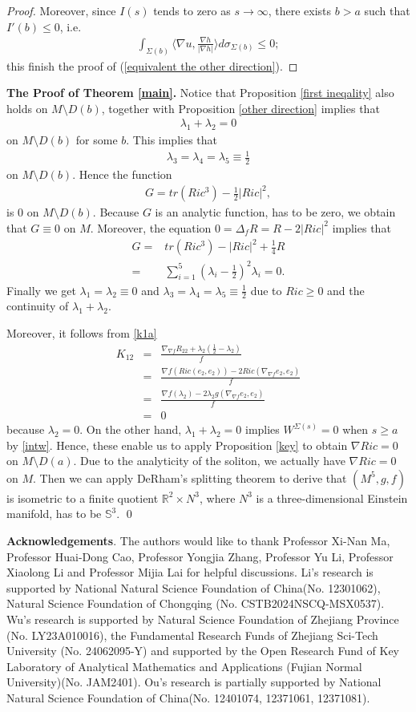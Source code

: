 \documentclass[12pt]{amsart}
\newcommand{\ban}{\begin{eqnarray*}}
\newcommand{\ean}{\end{eqnarray*}}
\begin{document}
\begin{proof}
	\smallskip
	Moreover, since $I(s)$ tends to zero as $s\rightarrow\infty$, there exists $b>a$ such that $I'(b)\leq 0$, i.e.
	\ban
	\int_{\Sigma(b)} \langle \nabla u, \frac{\nabla h}{|\nabla h|}\rangle d\sigma_{\Sigma(b)}\leq 0;
	\ean
	this finish the proof of (\ref{equivalent the other direction}).
\end{proof}

\textbf{The Proof of Theorem \ref{main}.}
Notice that Proposition \ref{first ineqality} also holds on $M\setminus D(b)$, together with Proposition \ref{other direction} implies that
\ban
\lambda_1+\lambda_2=0
\ean
on $M\setminus D(b)$ for some $b$. This implies that
\ban
\lambda_3=\lambda_4=\lambda_5\equiv \frac{1}{2}
\ean
on $M\setminus D(b)$.
Hence the function
\ban
G=tr(Ric^3)-\frac{1}{2}|Ric|^2,
\ean
is $0$ on $M\setminus D(b)$. Because $G$ is an analytic function, has to be zero, we obtain that $G\equiv 0$ on $M$. Moreover, the equation $0=\Delta_f R=R-2|Ric|^2$ implies that
\ban
G=&tr(Ric^3)-|Ric|^2+\frac{1}{4}R\\
=&\sum_{i=1}^5(\lambda_i-\frac{1}{2})^2 \lambda_i=0.
\ean
Finally we get $\lambda_1=\lambda_2\equiv 0$ and $\lambda_3=\lambda_4=\lambda_5\equiv \frac{1}{2}$ due to $Ric\geq 0$ and the continuity of $\lambda_1+\lambda_2$.


Moreover, it follows from \eqref{k1a}
\ban
K_{12}&=&\frac{\nabla_{\nabla f}R_{22} +\lambda_2(\frac{1}{2}-\lambda_2)}{f}\\
&=&\frac{\nabla f (Ric(e_2, e_2))-2 Ric(\nabla_{\nabla f}e_2, e_2)}{f}\\
&=&\frac{\nabla f (\lambda_2)-2\lambda_2g(\nabla_{\nabla f}e_2, e_2)}{f}\\
&=&0
\ean
because $\lambda_2=0$. On the other hand, $\lambda_1+\lambda_2=0$ implies $W^{\Sigma(s)}=0$ when $s\geq a$ by \eqref{intw}.
Hence,  these enable us to apply Proposition \ref{key} to obtain $\nabla Ric =0$ on $M\setminus D(a)$. Due to the analyticity of the soliton, we actually have $\nabla Ric =0$ on $M$. Then we can apply DeRham's splitting theorem to derive that $(M^5, g, f)$ is isometric to a finite quotient $\mathbb{R}^2 \times {N}^3$, where ${N}^3$ is a three-dimensional Einstein manifold, has to be $\mathbb{S}^3$.
\qed

	
\vspace{0.5cm}
	\textbf{Acknowledgements}.
The authors would like to thank Professor Xi-Nan Ma, Professor Huai-Dong Cao, Professor Yongjia Zhang, Professor Yu Li, Professor Xiaolong Li and Professor Mijia Lai for helpful discussions. Li's research is supported by National Natural Science Foundation of China(No. 12301062), Natural Science Foundation of Chongqing (No. CSTB2024NSCQ-MSX0537). Wu's research is supported by Natural Science Foundation of Zhejiang Province (No. LY23A010016), the Fundamental Research Funds of Zhejiang Sci-Tech University (No. 24062095-Y) and supported by the Open Research Fund of Key Laboratory of Analytical Mathematics and Applications (Fujian Normal University)(No. JAM2401). Ou's research  is partially supported by National Natural Science Foundation of China(No. 12401074, 12371061, 12371081).
	
\end{document}
